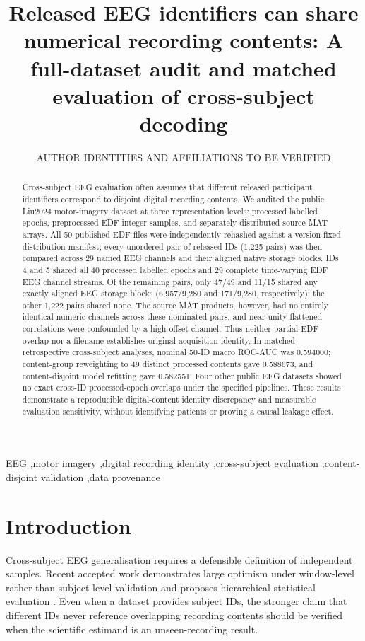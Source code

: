 \documentclass[preprint,12pt]{elsarticle}
\begin{document}
\begin{frontmatter}
\title{Released EEG identifiers can share numerical recording contents:
A full-dataset audit and matched evaluation of cross-subject decoding}
\author{AUTHOR IDENTITIES AND AFFILIATIONS TO BE VERIFIED}
\begin{abstract}
Cross-subject EEG evaluation often assumes that different released
participant identifiers correspond to disjoint digital recording
contents. We audited the public Liu2024 motor-imagery dataset at
three representation levels: processed labelled epochs, preprocessed
EDF integer samples, and separately distributed source MAT arrays.
All 50 published EDF files were independently rehashed against a
version-fixed distribution manifest; every unordered pair of
released IDs (1,225 pairs) was then compared across 29 named EEG
channels and their aligned native storage blocks. IDs 4 and 5
shared all 40 processed labelled epochs and 29 complete
time-varying EDF EEG channel streams. Of the remaining pairs,
only 47/49 and 11/15 shared any exactly aligned EEG storage
blocks (6,957/9,280 and 171/9,280, respectively); the other
1,222 pairs shared none. The source MAT products, however, had
no entirely identical numeric channels across these nominated
pairs, and near-unity flattened correlations were confounded by
a high-offset channel. Thus neither partial EDF overlap nor a
filename establishes original acquisition identity. In matched
retrospective cross-subject analyses, nominal 50-ID macro ROC-AUC
was 0.594000; content-group reweighting to 49 distinct processed
contents gave 0.588673, and content-disjoint model refitting
gave 0.582551. Four other public EEG datasets showed no exact
cross-ID processed-epoch overlaps under the specified pipelines.
These results demonstrate a reproducible digital-content identity
discrepancy and measurable evaluation sensitivity, without
identifying patients or proving a causal leakage effect.
\end{abstract}

\begin{keyword}
EEG \sep motor imagery \sep digital recording identity \sep cross-subject
evaluation \sep content-disjoint validation \sep data provenance
\end{keyword}
\end{frontmatter}

\section{Introduction}
Cross-subject EEG generalisation requires a defensible definition of
independent samples. Recent accepted work demonstrates large optimism
under window-level rather than subject-level validation and proposes
hierarchical statistical evaluation \cite{gil2026subjectvalidation}.
Even when a dataset provides subject IDs, the stronger claim that
different IDs never reference overlapping recording contents should be
verified when the scientific estimand is an unseen-recording result.
\end{document}
